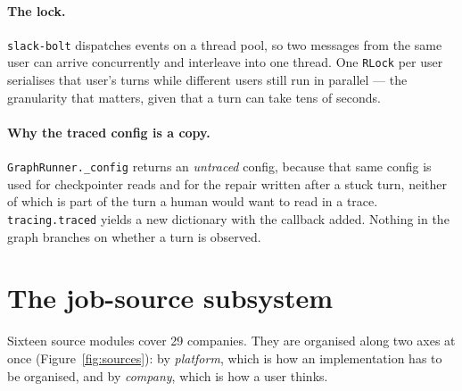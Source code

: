 \documentclass[11pt,a4paper]{article}
\begin{document}
\paragraph{The lock.} \texttt{slack-bolt} dispatches events on a thread pool, so two
messages from the same user can arrive concurrently and interleave into one thread. One
\texttt{RLock} per user serialises that user's turns while different users still run in
parallel --- the granularity that matters, given that a turn can take tens of seconds.

\paragraph{Why the traced config is a copy.} \texttt{GraphRunner.\_\allowbreak{}config} returns an
\emph{untraced} config, because that same config is used for checkpointer reads and for the
repair written after a stuck turn, neither of which is part of the turn a human would want
to read in a trace. \texttt{tracing.traced} yields a new dictionary with the callback added.
Nothing in the graph branches on whether a turn is observed.

\section{The job-source subsystem}

Sixteen source modules cover 29 companies. They are organised along two axes at once
(Figure~\ref{fig:sources}): by \emph{platform}, which is how an implementation has to be
organised, and by \emph{company}, which is how a user thinks.
\end{document}
